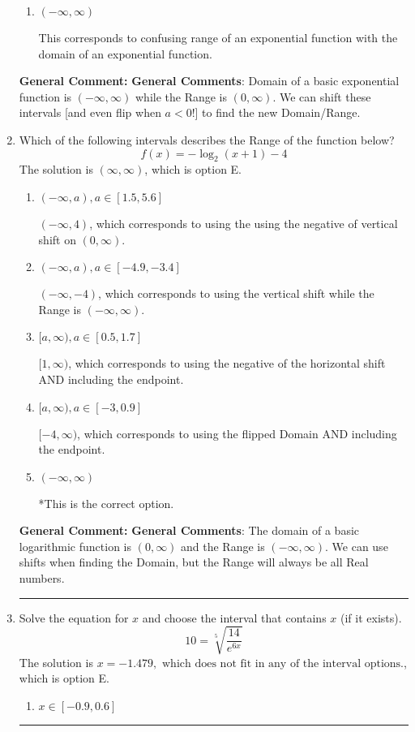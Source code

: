 \documentclass{extbook}[14pt]
\newcommand{\litem}[1]{\item #1

\rule{\textwidth}{0.4pt}}
\begin{document}
\begin{enumerate}
{\begin{enumerate}[label=\Alph*.]
$(-\infty, 8]$, which corresponds to using the negative vertical shift AND flipping the Range interval AND including the endpoint.
\item \( (-\infty, \infty) \)

This corresponds to confusing range of an exponential function with the domain of an exponential function.
\end{enumerate}

\textbf{General Comment:} \textbf{General Comments}: Domain of a basic exponential function is $(-\infty, \infty)$ while the Range is $(0, \infty)$. We can shift these intervals [and even flip when $a<0$!] to find the new Domain/Range.
}
\litem{
Which of the following intervals describes the Range of the function below?
\[ f(x) = -\log_2{(x+1)}-4 \]The solution is \( (\infty, \infty) \), which is option E.\begin{enumerate}[label=\Alph*.]
\item \( (-\infty, a), a \in [1.5, 5.6] \)

$(-\infty, 4)$, which corresponds to using the using the negative of vertical shift on $(0, \infty)$.
\item \( (-\infty, a), a \in [-4.9, -3.4] \)

$(-\infty, -4)$, which corresponds to using the vertical shift while the Range is $(-\infty, \infty)$.
\item \( [a, \infty), a \in [0.5, 1.7] \)

$[1, \infty)$, which corresponds to using the negative of the horizontal shift AND including the endpoint.
\item \( [a, \infty), a \in [-3, 0.9] \)

$[-4, \infty)$, which corresponds to using the flipped Domain AND including the endpoint.
\item \( (-\infty, \infty) \)

*This is the correct option.
\end{enumerate}

\textbf{General Comment:} \textbf{General Comments}: The domain of a basic logarithmic function is $(0, \infty)$ and the Range is $(-\infty, \infty)$. We can use shifts when finding the Domain, but the Range will always be all Real numbers.
}
\litem{
 Solve the equation for $x$ and choose the interval that contains $x$ (if it exists).
\[  10 = \sqrt[5]{\frac{14}{e^{6x}}} \]The solution is \( x = -1.479, \text{ which does not fit in any of the interval options.} \), which is option E.\begin{enumerate}[label=\Alph*.]
\item \( x \in [-0.9, 0.6] \)


\end{enumerate}}
\end{enumerate}
\end{document}

